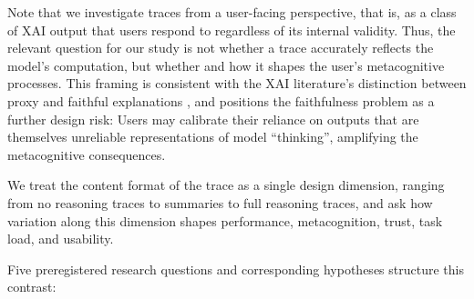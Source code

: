 \documentclass[manuscript, anonymous=false,authorversion,review=false]{acmart}
\begin{document}
Note that we investigate traces from a user-facing perspective, that is, as a class of XAI output that users respond to regardless of its internal validity. Thus, the relevant question for our study is not whether a trace accurately reflects the model's computation, but whether and how it shapes the user's metacognitive processes. This framing is consistent with the XAI literature's distinction between proxy and faithful explanations \cite{barez2025chain, jacovi-goldberg-2020-towards, 10.5555/3666122.3669397}, and positions the faithfulness problem as a further design risk: Users may calibrate their reliance on outputs that are themselves unreliable representations of model ``thinking'', amplifying the metacognitive consequences.


We treat the content format of the trace as a single design dimension, ranging from no reasoning traces to summaries to full reasoning traces, and ask how variation along this dimension shapes performance, metacognition, trust, task load, and usability. 

Five preregistered research questions and corresponding hypotheses structure this contrast:
\end{document}
